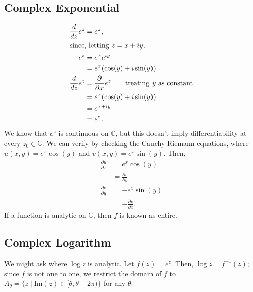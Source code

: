 \documentclass[10pt]{extarticle}
\newcommand{\C}{\mathbb{C}}
\begin{document}
  \subsection{Complex Exponential}%
  \begin{align*}
    \frac{d}{dz}e^z &= e^z,\\
    \intertext{since, letting $z = x+iy$,}
    e^z &= e^{x}e^{iy}\\
        &= e^x(\cos(y) + i\sin(y)).\\
    \frac{d}{dz} e^z &= \frac{\partial}{\partial x}e^z \tag*{treating $y$ as constant}\\
                     &= e^x(\cos(y) + i\sin(y))\\
                     &= e^{x + iy}\\
                     &= e^z.
  \end{align*}
  We know that $e^z$ is continuous on $\C$, but this doesn't imply differentiability at every $z_0\in \C$. We can verify by checking the Cauchy-Riemann equations, where $u(x,y) = e^x\cos(y)$ and $v(x,y) = e^x\sin(y)$. Then,
  \begin{align*}
    \frac{\partial u}{\partial x} &= e^x\cos(y)\\
                                  &= \frac{\partial v}{\partial y}\\
    \frac{\partial v}{\partial y} &= -e^x\sin(y)\\
                                  &= -\frac{\partial v}{\partial x}.
  \end{align*}
  If a function is analytic on $\C$, then $f$ is known as entire.
  \subsection{Complex Logarithm}%
  We might ask where $\log z$ is analytic. Let $f(z) = e^z$. Then, $\log z = f^{-1}(z)$; since $f$ is not one to one, we restrict the domain of $f$ to $A_{\theta} = \{z\mid \text{Im}(z)\in [\theta,\theta + 2\pi)\}$ for any $\theta$.\\
\end{document}
